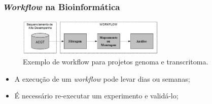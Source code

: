 \documentclass{beamer}
\begin{document}
\begin{frame}
\frametitle{\textit{Workflow} na Bioinform\'atica}
\begin{figure}
\centering
\includegraphics[width=200pt]{images/workflowBioinformatica.png}
\caption{Exemplo de workflow para projetos genoma e transcritoma.}
\label{fig:entidadeprovdm}
\end{figure}
\begin{itemize}
\item A execu\c{c}\~ao de um \textit{workflow} pode levar dias ou semanas;
\item \'E necess\'ario re-executar um experimento e valid\'a-lo;
\end{itemize}
\end{frame}

\end{document}
